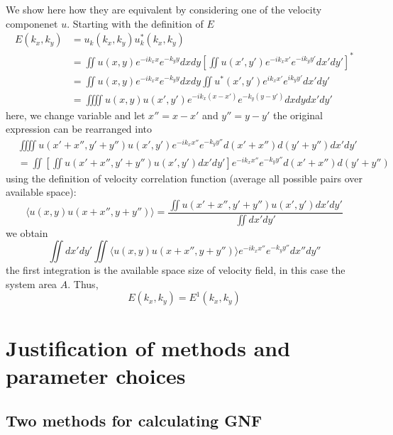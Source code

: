 \documentclass[preprint,aps,prl,amsmath,amssymb,longbibliography]{revtex4-2}
\begin{document}
We show here how they are equivalent by considering one of the velocity componenet $u$. Starting with the definition of $E$
\begin{equation}
\begin{split}
E(k_x, k_y) &= u_k(k_x, k_y)u_k^*(k_x, k_y)\\
& = \iint u(x, y)e^{-ik_xx}e^{-k_yy}dxdy\left[\iint u(x', y')e^{-ik_xx'}e^{-ik_yy'}dx'dy'\right]^*\\
& = \iint u(x, y)e^{-ik_xx}e^{-k_yy}dxdy\iint u^*(x', y')e^{ik_xx'}e^{ik_yy'}dx'dy'\\
& = \iiiint u(x, y)u(x', y')e^{-ik_x(x-x')}e^{-k_y(y-y')}dxdydx'dy'
\end{split}
\end{equation}
here, we change variable and let $x'' = x - x'$ and $y'' = y - y'$ the original expression can be rearranged into
\begin{equation}
\begin{split}
& \iiiint u(x'+x'', y'+y'')u(x', y')e^{-ik_xx''}e^{-k_yy''}d(x'+x'')d(y'+y'')dx'dy'\\
& = \iint \left[\iint u(x'+x'', y'+y'')u(x', y')dx'dy'\right] e^{-ik_xx''}e^{-k_yy''} d(x'+x'')d(y'+y'')
\end{split}
\end{equation}
using the definition of velocity correlation function (average all possible pairs over available space):
\begin{equation}
\langle u(x, y)u(x+x'', y+y'') \rangle = \frac{\iint u(x'+x'', y'+y'')u(x', y')dx'dy'}{\iint dx'dy'}
\end{equation}
we obtain
\begin{equation}
\iint dx'dy'\iint \langle u(x, y)u(x+x'', y+y'') \rangle e^{-ik_xx''}e^{-k_yy''} dx''dy''
\end{equation}
the first integration is the available space size of velocity field, in this case the system area $A$. Thus,
\begin{equation}
E(k_x, k_y) = E^1(k_x, k_y)
\end{equation}



\section{Justification of methods and parameter choices}
\label{GNF-justification}
\subsection{Two methods for calculating GNF}
\end{document}
